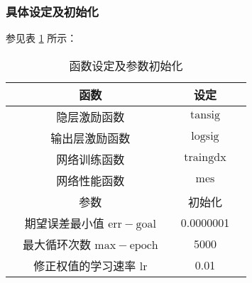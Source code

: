   \subsubsection{具体设定及初始化}
    参见表 \ref{tab:shedingchushihua} 所示：
    \begin{table}[thb]
      \centering
      \caption{函数设定及参数初始化}
      \begin{tabular*}{0.618\paperwidth}{@{\extracolsep{\fill}}ccccc}
        \toprule[1.5pt]
        &函数 && 设定 &\\
        \midrule[1pt]
        &隐层激励函数 && $\mathrm{tansig}$ &\\
        &输出层激励函数 && $\mathrm{logsig}$ &\\
        &网络训练函数 && $\mathrm{traingdx}$ &\\
        &网络性能函数 && $\mathrm{mes}$ &\\
        \midrule[1pt]
        \midrule[1pt]
        &参数 && 初始化 &\\
        \midrule[1pt]
        &期望误差最小值 $\mathrm{err-goal}$ && 0.0000001 &\\
        &最大循环次数 $\mathrm{max-epoch}$ && 5000 &\\
        &修正权值的学习速率 $\mathrm{lr}$ && 0.01 &\\
        \bottomrule[1.5pt]
      \end{tabular*}
      \label{tab:shedingchushihua}
    \end{table}